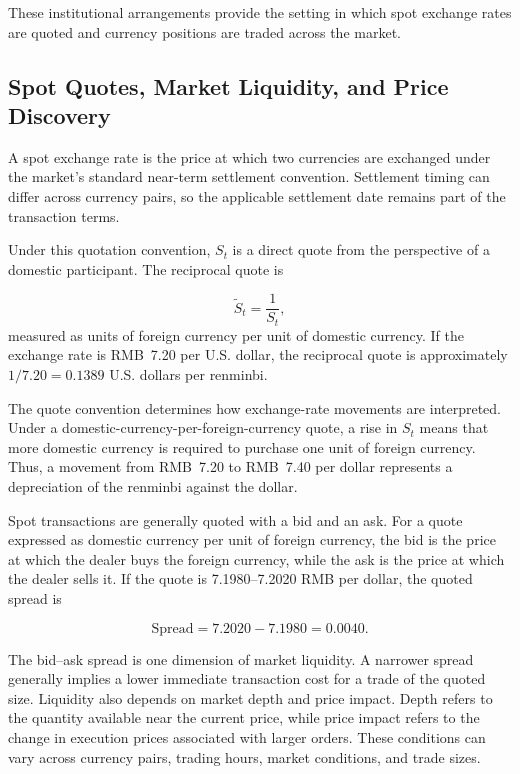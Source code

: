 These institutional arrangements provide the setting
in which spot exchange rates are quoted and currency
positions are traded across the market.

\subsection{Spot Quotes, Market Liquidity, and Price Discovery}

A spot exchange rate is the price at which two currencies are exchanged under the market's standard near-term settlement convention. Settlement timing can differ across currency pairs, so the applicable settlement date remains part of the transaction terms.

Under this quotation convention, $S_t$ is a direct
quote from the perspective of a domestic participant.
The reciprocal quote is

\begin{equation}
\widetilde{S}_t=\frac{1}{S_t},
\label{eq:ch10-reciprocal-quote}
\end{equation}
measured as units of foreign currency per unit of domestic currency. If the exchange rate is RMB~7.20 per U.S. dollar, the reciprocal quote is approximately $1/7.20=0.1389$ U.S. dollars per renminbi.

The quote convention determines how exchange-rate movements are interpreted. Under a domestic-currency-per-foreign-currency quote, a rise in $S_t$ means that more domestic currency is required to purchase one unit of foreign currency. Thus, a movement from RMB~7.20 to RMB~7.40 per dollar represents a depreciation of the renminbi against the dollar.

Spot transactions are generally quoted with a bid and an ask. For a quote expressed as domestic currency per unit of foreign currency, the bid is the price at which the dealer buys the foreign currency, while the ask is the price at which the dealer sells it. If the quote is 7.1980--7.2020 RMB per dollar, the quoted spread is

\begin{equation*}
\text{Spread}=7.2020-7.1980=0.0040.
\label{eq:ch10-fx-spread}
\end{equation*}

The bid--ask spread is one dimension of market liquidity. A narrower spread generally implies a lower immediate transaction cost for a trade of the quoted size. Liquidity also depends on market depth and price impact. Depth refers to the quantity available near the current price, while price impact refers to the change in execution prices associated with larger orders. These conditions can vary across currency pairs, trading hours, market conditions, and trade sizes.

